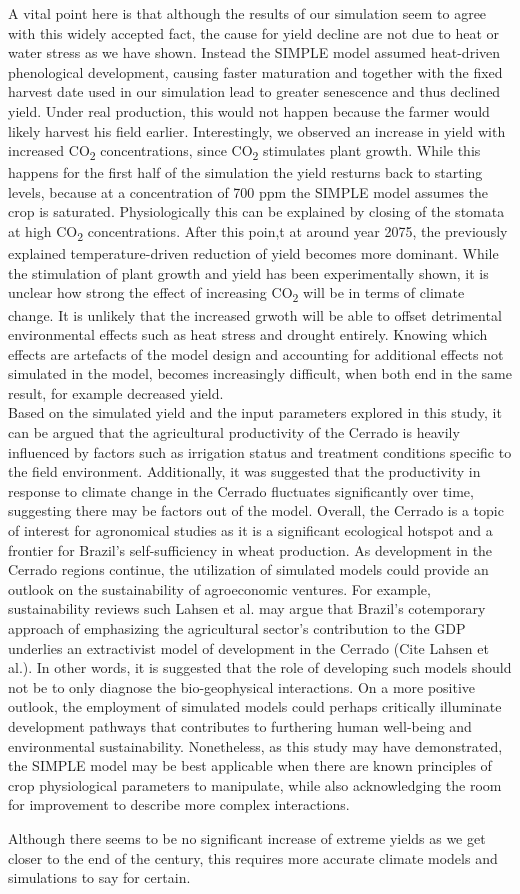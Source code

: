 \documentclass[11pt]{article}
\begin{document}
A vital point here is that although the results of our simulation seem to agree with this widely accepted fact, the cause for yield decline are not due to heat or water stress as we have shown. Instead the SIMPLE model assumed heat-driven phenological development, causing faster maturation and together with the fixed harvest date used in our simulation lead to greater senescence and thus declined yield. Under real production, this would not happen because the farmer would likely harvest his field earlier. Interestingly, we observed an increase in yield with increased CO\textsubscript{2} concentrations, since CO\textsubscript{2} stimulates plant growth. While this happens for the first half of the simulation the yield resturns back to starting levels, because at a concentration of 700 ppm the SIMPLE model assumes the crop is saturated. Physiologically this can be explained by closing of the stomata at high CO\textsubscript{2} concentrations. After this poin,t at around year 2075, the previously explained temperature-driven reduction of yield becomes more dominant. While the stimulation of plant growth and yield has been experimentally shown, it is unclear  how strong the effect of increasing CO\textsubscript{2} will be in terms of climate change. It is unlikely that the increased grwoth will be able to offset detrimental environmental effects such as heat stress and drought entirely.
Knowing which effects are artefacts of the model design and accounting for additional effects not simulated in the model, becomes increasingly difficult, when both end in the same result, for example decreased yield.\\


Based on the simulated yield and the input parameters explored in this study, it can be argued that the agricultural productivity of the Cerrado is heavily influenced by factors such as irrigation status and treatment conditions specific to the field environment. Additionally, it was suggested that the productivity in response to climate change in the Cerrado fluctuates significantly over time, suggesting there may be factors out of the model. Overall, the Cerrado is a topic of interest for agronomical studies as it is a significant ecological hotspot and a frontier for Brazil’s self-sufficiency in wheat production. As development in the Cerrado regions continue, the utilization of simulated models could provide an outlook on the sustainability of agroeconomic ventures.  For example, sustainability reviews such Lahsen et al. may argue that Brazil’s cotemporary approach of emphasizing the agricultural sector’s contribution to the GDP underlies an extractivist model of development in the Cerrado (Cite Lahsen et al.). In other words, it is suggested that the role of developing such models should not be to only diagnose the bio-geophysical interactions. On a more positive outlook, the employment of simulated models could perhaps critically illuminate development pathways that contributes to furthering human well-being and environmental sustainability. Nonetheless, as this study may have demonstrated, the SIMPLE model may be best applicable when there are known principles of crop physiological parameters to manipulate, while also acknowledging the room for improvement to describe more complex interactions.

Although there seems to be no significant increase of extreme yields as we get closer to the end of the century, this requires more accurate climate models and simulations to say for certain.


\printbibliography
\end{document}
